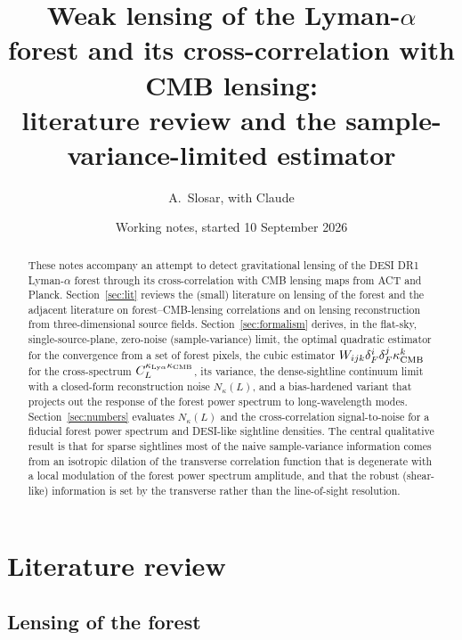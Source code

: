 \documentclass[11pt,a4paper]{article}
\title{Weak lensing of the Lyman-$\alpha$ forest and its cross-correlation with CMB lensing:\\ literature review and the sample-variance-limited estimator}
\author{A.~Slosar, with Claude}
\date{Working notes, started 10 September 2026}
\newcommand{\dF}{\delta_F}
\newcommand{\kcmb}{\kappa_{\rm CMB}}
\newcommand{\klya}{\kappa_{{\rm Ly}\alpha}}
\begin{document}
\maketitle

\begin{abstract}
These notes accompany an attempt to detect gravitational lensing of the DESI DR1 Lyman-$\alpha$ forest through its cross-correlation with CMB lensing maps from ACT and Planck. Section~\ref{sec:lit} reviews the (small) literature on lensing of the forest and the adjacent literature on forest--CMB-lensing correlations and on lensing reconstruction from three-dimensional source fields. Section~\ref{sec:formalism} derives, in the flat-sky, single-source-plane, zero-noise (sample-variance) limit, the optimal quadratic estimator for the convergence from a set of forest pixels, the cubic estimator $W_{ijk}\dF^i\dF^j\kcmb^k$ for the cross-spectrum $C_L^{\klya\kcmb}$, its variance, the dense-sightline continuum limit with a closed-form reconstruction noise $N_\kappa(L)$, and a bias-hardened variant that projects out the response of the forest power spectrum to long-wavelength modes. Section~\ref{sec:numbers} evaluates $N_\kappa(L)$ and the cross-correlation signal-to-noise for a fiducial forest power spectrum and DESI-like sightline densities. The central qualitative result is that for sparse sightlines most of the naive sample-variance information comes from an isotropic dilation of the transverse correlation function that is degenerate with a local modulation of the forest power spectrum amplitude, and that the robust (shear-like) information is set by the transverse rather than the line-of-sight resolution.
\end{abstract}

\tableofcontents

\section{Literature review}
\label{sec:lit}

\subsection{Lensing of the forest}
\end{document}
